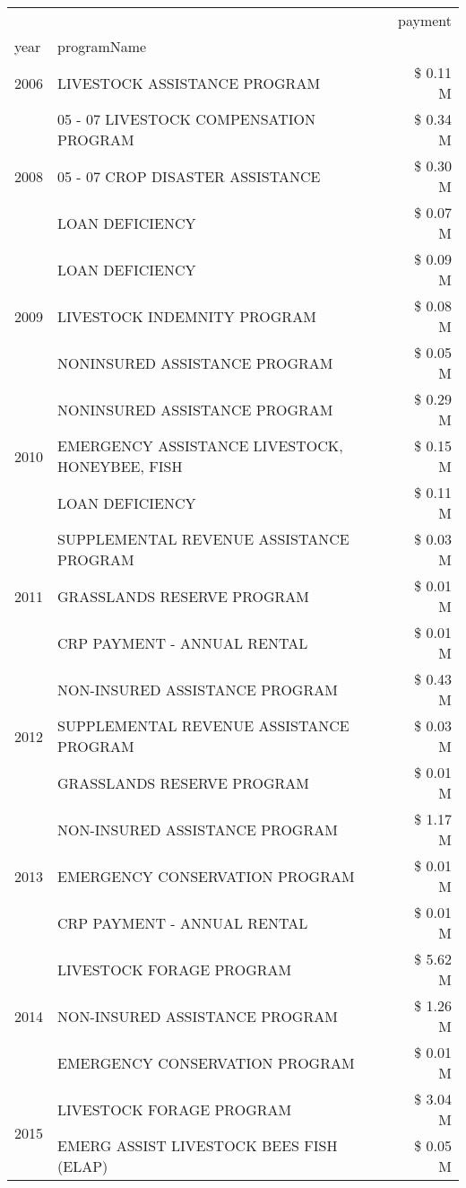\begin{tabular}{llr}
\toprule
 &  & payment \\
year & programName &  \\
\midrule
2006 & LIVESTOCK ASSISTANCE PROGRAM & \$ 0.11 M \\
\cline{1-3}
\multirow[t]{3}{*}{2008} & 05 - 07 LIVESTOCK COMPENSATION PROGRAM & \$ 0.34 M \\
 & 05 - 07 CROP DISASTER ASSISTANCE & \$ 0.30 M \\
 & LOAN DEFICIENCY & \$ 0.07 M \\
\cline{1-3}
\multirow[t]{3}{*}{2009} & LOAN DEFICIENCY & \$ 0.09 M \\
 & LIVESTOCK INDEMNITY PROGRAM & \$ 0.08 M \\
 & NONINSURED ASSISTANCE PROGRAM & \$ 0.05 M \\
\cline{1-3}
\multirow[t]{3}{*}{2010} & NONINSURED ASSISTANCE PROGRAM & \$ 0.29 M \\
 & EMERGENCY ASSISTANCE LIVESTOCK, HONEYBEE, FISH & \$ 0.15 M \\
 & LOAN DEFICIENCY & \$ 0.11 M \\
\cline{1-3}
\multirow[t]{3}{*}{2011} & SUPPLEMENTAL REVENUE ASSISTANCE PROGRAM & \$ 0.03 M \\
 & GRASSLANDS RESERVE PROGRAM & \$ 0.01 M \\
 & CRP PAYMENT - ANNUAL RENTAL & \$ 0.01 M \\
\cline{1-3}
\multirow[t]{3}{*}{2012} & NON-INSURED ASSISTANCE PROGRAM & \$ 0.43 M \\
 & SUPPLEMENTAL REVENUE ASSISTANCE PROGRAM & \$ 0.03 M \\
 & GRASSLANDS RESERVE PROGRAM & \$ 0.01 M \\
\cline{1-3}
\multirow[t]{3}{*}{2013} & NON-INSURED ASSISTANCE PROGRAM & \$ 1.17 M \\
 & EMERGENCY CONSERVATION PROGRAM & \$ 0.01 M \\
 & CRP PAYMENT - ANNUAL RENTAL & \$ 0.01 M \\
\cline{1-3}
\multirow[t]{3}{*}{2014} & LIVESTOCK FORAGE PROGRAM & \$ 5.62 M \\
 & NON-INSURED ASSISTANCE PROGRAM & \$ 1.26 M \\
 & EMERGENCY CONSERVATION PROGRAM & \$ 0.01 M \\
\cline{1-3}
\multirow[t]{3}{*}{2015} & LIVESTOCK FORAGE PROGRAM & \$ 3.04 M \\
 & EMERG ASSIST LIVESTOCK BEES FISH (ELAP) & \$ 0.05 M \\

\end{tabular}
